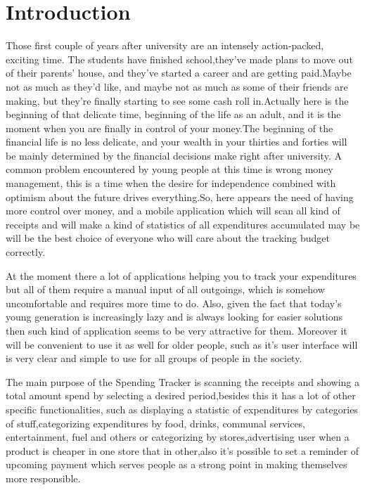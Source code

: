 \section*{Introduction}
Those first couple of years after university are an intensely action-packed, exciting time. The students have finished school,they’ve made plans to move out of their parents’ house, and they’ve started a career and are getting paid.Maybe not as much as they’d like, and maybe not as much as some of their friends are making, but they’re finally starting to see some cash roll in.Actually here is the beginning of that delicate time, beginning of the life as an adult, and it is the moment when you are finally in control of your money.The beginning of the financial life is no less delicate, and your wealth in your thirties and forties will be mainly determined by the financial decisions make right after university. A common problem encountered by young people at this time is wrong money management, this is a time when the desire for independence combined with optimism about the future drives everything.So, here appears the need of having more control over money, and a mobile application which will scan all kind of receipts and will make a kind of statistics of all expenditures accumulated may be will be the best choice of everyone who will care about the tracking budget correctly.

At the moment there a lot of applications helping you to track your expenditures but all of them require a manual input of all outgoings, which is somehow uncomfortable and requires more time to do. Also, given the fact that today's young generation is increasingly lazy and is always looking for easier solutions then such kind of application seems to be very attractive for them. Moreover it will be convenient to use it as well for older people, such as it's user interface will is very clear and simple to use for all groups of people in the society.

The main purpose of the Spending Tracker is scanning the receipts and showing a total amount spend by selecting a desired period,besides this it has a lot of other specific functionalities, such as displaying a statistic of expenditures by categories of stuff,categorizing expenditures by food, drinks, communal services, entertainment, fuel and others or categorizing by stores,advertising user when a product is cheaper in one store that in other,also it's possible to set a reminder of upcoming payment which serves people as a strong point in making themselves more responsible.

